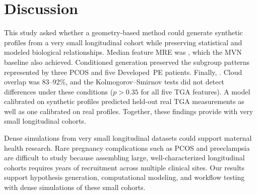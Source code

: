 \section{Discussion}
\label{sec:discussion}

This study asked whether a geometry-based method could generate synthetic profiles from a
very small longitudinal cohort while preserving statistical and modeled biological
relationships. Median feature MRE was , which the MVN baseline also achieved.
 Conditioned generation preserved the subgroup patterns represented by
three PCOS and five Developed~PE patients. Finally, . Cloud overlap was 83--92\%, and
the Kolmogorov--Smirnov tests did not detect differences under these conditions ($p>0.35$ for
all five TGA features). A model calibrated on synthetic profiles predicted held-out real TGA
measurements as well as one calibrated on real profiles.  Together, these findings provide  with very small longitudinal cohorts.

Dense simulations from very small longitudinal datasets could support maternal health
research. Rare pregnancy complications such as PCOS and preeclampsia are difficult to study
because assembling large, well-characterized longitudinal cohorts requires years of
recruitment across multiple clinical sites. Our results support hypothesis generation,
computational modeling, and workflow testing with dense simulations of these small cohorts.

